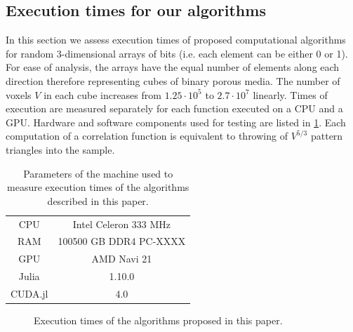 \documentclass[reprint,amsmath,amssymb,aps,pre,showkeys,showpacs]{revtex4-1}
\begin{document}
\subsection{Execution times for our algorithms}
In this section we assess execution times of proposed computational algorithms
for random 3-dimensional arrays of bits (i.e. each element can be either 0 or
1). For ease of analysis, the arrays have the equal number of elements along
each direction therefore representing cubes of binary porous media. The number
of voxels $V$ in each cube increases from $1.25 \cdot 10^5$ to $2.7 \cdot 10^7$
linearly. Times of execution are measured separately for each function executed
on a CPU and a GPU. Hardware and software components used for testing are listed
in \cref{tab:machine}. Each computation of a correlation function is equivalent
to throwing of $V^{5/3}$ pattern triangles into the sample.
\begin{table}[!htp]
  \centering
  \begin{tabular}{|c|c|}
    CPU & Intel Celeron 333 MHz \\
    RAM & 100500 GB DDR4 PC-XXXX \\
    GPU & AMD Navi 21 \\
    Julia & 1.10.0 \\
    CUDA.jl & 4.0
  \end{tabular}
  \caption{Parameters of the machine used to measure execution times of the
    algorithms described in this paper.}
  \label{tab:machine}
\end{table}
\begin{figure}[tp]
  \centering
  \hfill
  \caption[]{Execution times of the algorithms proposed in this paper.}
  \label{fig:timings}
\end{figure}
\end{document}
